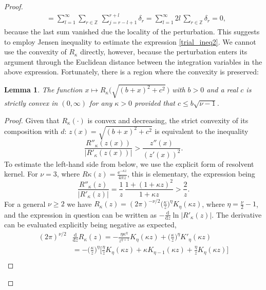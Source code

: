 \documentclass{article}
\numberwithin{equation}{section}
\newtheorem{lemma}[theorem]{Lemma}
\theoremstyle{definition}
\newcommand{\D}{\mathrm{d}}
\newcommand{\e}{\mathrm{e}}
\newcommand{\Z}{\mathbb{Z}}
\begin{document}
\begin{proof}
\begin{align*}
& = \sum_{l=1}^\infty \sum_{r\in\Z}\, \sum_{j=r-l+1}^{r+l} \delta_r = \sum_{l=1}^\infty 2l\,\sum_{r\in\Z} \delta_r = 0,
\end{align*}
because the last sum vanished due the locality of the perturbation. This suggests to employ Jensen inequality to estimate the expression \eqref{trial_ineq2}. We cannot use the convexity of $R_\kappa$ directly, however, because the perturbation enters its argument through the Euclidean distance between the integration variables in the above expression. Fortunately, there is a region where the convexity is preserved:
\begin{lemma} \label{l:comp_convex}
The function $x\mapsto R_\kappa\big(\sqrt{(b+x)^2+c^2}\,\big)$ with $b>0$ and a real $c$ is strictly convex in $(0,\infty)$ for any $\kappa>0$ provided that $c\le b\sqrt{\nu-1}$.
\end{lemma}
\begin{proof}
Given that $R_\kappa(\cdot)$ is convex and decreasing, the strict convexity of its composition with $d:\,z(x)=\sqrt{(b+x)^2+c^2}$ is equivalent to the inequality
\begin{equation*}
\frac{R''_\kappa(z(x))}{|R'_\kappa(z(x))|} > \frac{z''(x)}{(z'(x))^2}.
\end{equation*}
To estimate the left-hand side from below, we use the explicit form of resolvent kernel. For $\nu = 3$, where $R\kappa(z) = \frac{\e^{-\kappa z}}{4\pi z}$, this is elementary, the expression being
\begin{equation*}
\frac{R''_\kappa(z)}{|R'_\kappa(z)|} = \frac{1}{z}\, \frac{1+(1+\kappa z)^2}{1+\kappa z} > \frac{2}{z}.
\end{equation*}
For a general $\nu\ge 2$ we have $R_\kappa(z) = (2\pi)^{-\nu/2} \big(\frac{\kappa}{z}\big)^\eta K_\eta(\kappa z)$, where $\eta= \frac{\nu}{2}-1$, and the expression in question can be written as $-\frac{\D}{\D z}\ln|R'_\kappa(z)|$. The derivative can be evaluated explicitly being negative as expected,
\begin{align*}
(2\pi)^{\nu/2} & \frac{\D}{\D z} R_\kappa(z) = -\frac{\eta\kappa^\eta}{z^{\eta+1}} K_\eta(\kappa z) + \big(\textstyle{\frac{\kappa}{z}}\big)^\eta K'_\eta(\kappa z) \\
& = -\big(\textstyle{\frac{\kappa}{z}}\big)^\eta \Big[ \frac{\eta}{z} K_\eta(\kappa z) +\kappa K_{\eta-1}(\kappa z) +\frac{\eta}{z} K_\eta(\kappa z)\Big] \\

\end{align*}
\end{proof}
\end{proof}
\end{document}
